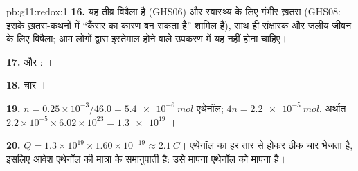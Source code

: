 \begin{solution}{pb:g11:redox:1}
\textbf{16.} यह तीव्र विषैला है (GHS06) और स्वास्थ्य के लिए गंभीर ख़तरा
(GHS08: इसके ख़तरा-कथनों में ``कैंसर का कारण बन सकता है'' शामिल है), साथ ही
संक्षारक और जलीय जीवन के लिए विषैला; आम लोगों द्वारा इस्तेमाल होने वाले उपकरण में
यह नहीं होना चाहिए।

\textbf{17.}  और
:
।

\textbf{18.} चार ।

\textbf{19.} $n = 0.25\times 10^{-3}/46.0 = \qty{5.4e-6}{mol}$
एथेनॉल;  $4n = \qty{2.2e-5}{mol}$, अर्थात
$2.2\times 10^{-5}\times 6.02\times 10^{23} = \num{1.3e19}$ ।

\textbf{20.} $Q = 1.3\times 10^{19}\times 1.60\times 10^{-19} \approx
\qty{2.1}{C}$। एथेनॉल का हर  तार से होकर ठीक चार 
भेजता है, इसलिए आवेश एथेनॉल की मात्रा के समानुपाती है:
उसे मापना एथेनॉल को मापना है।
\end{solution}

